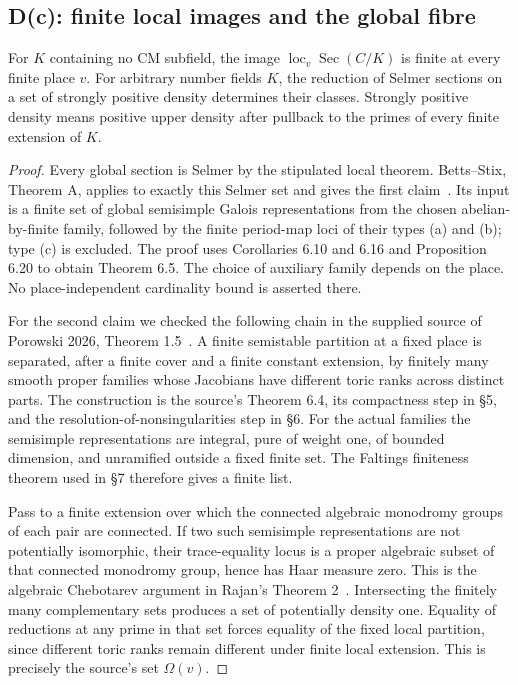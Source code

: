 \subsection{D(c): finite local images and the global fibre}

\begin{proposition}
\label{D-rigidity}
For $K$ containing no CM subfield, the image
$\operatorname{loc}_v\operatorname{Sec}(C/K)$
is finite at every finite place $v$.
For arbitrary number fields $K$, the reduction
of Selmer sections on a set of strongly positive
density determines their classes. Strongly
positive density means positive upper density
after pullback to the primes of every finite
extension of $K$.
\end{proposition}
\begin{proof}
Every global section is Selmer by the stipulated
local theorem. Betts--Stix, Theorem A, applies
to exactly this Selmer set and gives the first
claim~\cite{BettsStix2025}. Its input is a finite
set of global semisimple Galois representations
from the chosen abelian-by-finite family, followed
by the finite period-map loci of their types
(a) and (b); type (c) is excluded. The proof uses
Corollaries 6.10 and 6.16 and Proposition 6.20
to obtain Theorem 6.5. The choice of auxiliary
family depends on the place. No place-independent
cardinality bound is asserted there.

For the second claim we checked the following
chain in the supplied source of Porowski 2026,
Theorem 1.5~\cite{Porowski2026}. A finite
semistable partition at a fixed place is
separated, after a finite cover and a finite
constant extension, by finitely many smooth
proper families whose Jacobians have different
toric ranks across distinct parts. The
construction is the source's Theorem 6.4,
its compactness step in \S5, and the
resolution-of-nonsingularities step in \S6.
For the actual families the semisimple
representations are integral, pure of weight
one, of bounded dimension, and unramified
outside a fixed finite set. The Faltings
finiteness theorem used in \S7 therefore
gives a finite list.

Pass to a finite extension over which the
connected algebraic monodromy groups of each
pair are connected. If two such semisimple
representations are not potentially isomorphic,
their trace-equality locus is a proper
algebraic subset of that connected monodromy
group, hence has Haar measure zero. This is
the algebraic Chebotarev argument in Rajan's
Theorem 2~\cite{Rajan1998}. Intersecting the
finitely many complementary sets produces a
set of potentially density one. Equality of
reductions at any prime in that set forces
equality of the fixed local partition, since
different toric ranks remain different under
finite local extension. This is precisely
the source's set $\Omega(v)$.


\end{proof}
